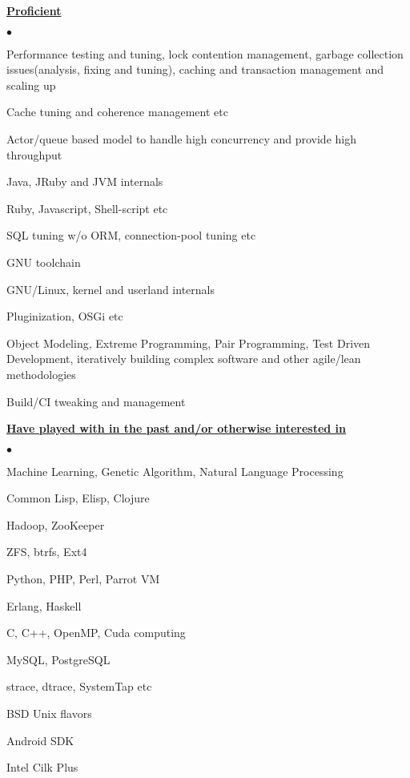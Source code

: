 \documentclass[margin,line]{res}
\newenvironment{list2}{
  \begin{list}{$\bullet$}{%
      \setlength{\itemsep}{0in}
      \setlength{\parsep}{0in} \setlength{\parskip}{0in}
      \setlength{\topsep}{0in} \setlength{\partopsep}{0in} 
      \setlength{\leftmargin}{0.2in}}}{\end{list}}
\begin{document}
\begin{resume}
{\underline {\bf Proficient}} \hfill\\
\vspace{-.3cm}
\begin{list2}
\item Performance testing and tuning, lock contention management, garbage collection issues(analysis, fixing and tuning), caching and transaction management and scaling up
\item Cache tuning and coherence management etc
\item Actor/queue based model to handle high concurrency and provide high throughput
\item Java, JRuby and JVM internals
\item Ruby, Javascript, Shell-script etc
\item SQL tuning w/o ORM, connection-pool tuning etc
\item GNU toolchain
\item GNU/Linux, kernel and userland internals
\item Pluginization, OSGi etc
\item Object Modeling, Extreme Programming, Pair Programming, Test Driven Development, iteratively building complex software and other agile/lean methodologies
\item Build/CI tweaking and management
\end{list2}

{\underline {\bf Have played with in the past and/or otherwise interested in}} \hfill\\
\vspace{-.3cm}
\begin{list2}
\item Machine Learning, Genetic Algorithm, Natural Language Processing
\item Common Lisp, Elisp, Clojure
\item Hadoop, ZooKeeper
\item ZFS, btrfs, Ext4
\item Python, PHP, Perl, Parrot VM
\item Erlang, Haskell
\item C, C++, OpenMP, Cuda computing
\item MySQL, PostgreSQL
\item strace, dtrace, SystemTap etc
\item BSD Unix flavors
\item Android SDK
\item Intel Cilk Plus
\end{list2}


\end{resume}
\end{document}
